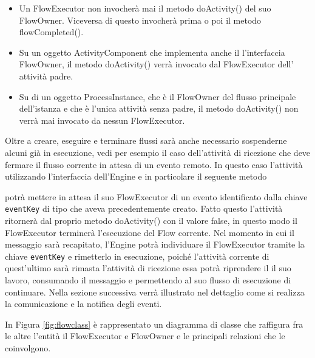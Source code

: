 \begin{itemize}
  \item Un FlowExecutor non invocherà mai il metodo doActivity() del suo
  FlowOwner. Viceversa di questo invocherà prima o poi il metodo
  flowCompleted().
  
  \item Su un oggetto ActivityComponent che implementa anche il l'interfaccia
  FlowOwner, il metodo doActivity() verrà invocato dal FlowExecutor dell'
  attività padre.
  
  \item Su di un oggetto ProcessInstance, che \`e il FlowOwner del flusso
  principale dell'istanza e che \`e l'unica attività senza padre, 
  il metodo doActivity() non verrà mai invocato da nessun FlowExecutor.
  
\end{itemize}

Oltre a creare, eseguire e terminare flussi sarà anche necessario sospenderne
alcuni già in esecuzione, vedi per esempio il caso dell'attività di ricezione
che deve fermare il flusso corrente in attesa di un evento remoto. In questo
caso l'attività utilizzando l'interfaccia dell'Engine e in particolare il
seguente metodo



potrà mettere in attesa il suo FlowExecutor di un evento identificato dalla
chiave \texttt{eventKey} di tipo  che aveva
precedentemente creato. Fatto questo l'attività ritornerà dal proprio metodo
doActivity() con il valore false, in questo modo il FlowExecutor terminerà
l'esecuzione del Flow corrente. Nel momento in cui il messaggio sarà recapitato,
l'Engine potrà individuare il FlowExecutor tramite la chiave \texttt{eventKey} e
rimetterlo in esecuzione, poiché l'attività corrente di quest'ultimo sarà rimasta
l'attività di ricezione essa potrà riprendere il il suo lavoro, consumando il
messaggio e permettendo al suo flusso di esecuzione di continuare. Nella sezione
successiva verrà illustrato nel dettaglio come si realizza la comunicazione e la
notifica degli eventi.

In Figura \ref{fig:flowclass} \`e rappresentato un diagramma di classe che
raffigura fra le altre l'entità il FlowExecutor e FlowOwner e le principali
relazioni che le coinvolgono.

